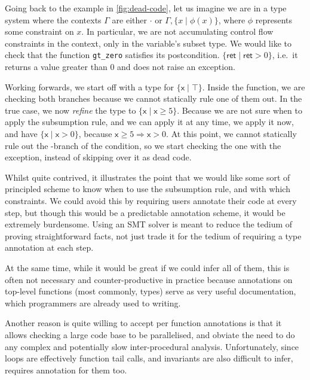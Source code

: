 
Going back to the example in \cref{fig:dead-code}, let us imagine we are in a
type system where the contexts $\Gamma$ are either $\cdot$ or $\Gamma, \{ x \mid
\phi(x) \}$, where $\phi$ represents some constraint on $x$. In particular, we
are not accumulating control flow constraints in the context, only
in the variable's subset type. We would like to check that the function
\texttt{gt_zero} satisfies its postcondition. $ \{ \mathsf{ret} \mid
\mathsf{ret} > 0 \} $, i.e.\ it returns a value greater than 0 and does not
raise an exception.

Working forwards, we start off with a type for $\{ \mathsf{x} \mid \top \}$.
Inside the function, we are checking both branches because we cannot statically
rule one of them out. In the true case, we now \emph{refine} the type to $\{
\mathsf{x} \mid \mathsf{x} \geq 5 \}$. Because we are not sure when to apply
the subsumption rule, and we can apply it at any time, we apply it now, and
have $\{ \mathsf{x} \mid \mathsf{x} > 0 \}$, because $\mathsf{x} \geq 5
\Rightarrow \mathsf{x} > 0$. At this point, we cannot statically rule out the
-branch of the condition, so we start checking the one with the
exception, instead of skipping over it as dead code.

Whilst quite contrived, it illustrates the point that we would like some sort
of principled scheme to know when to use the subsumption rule, and with which
constraints. We could avoid this by requiring users annotate their code at
every step, but though this would be a predictable annotation scheme, it would
be extremely burdensome. Using an SMT solver is meant to reduce the tedium of
proving straightforward facts, not just trade it for the tedium of requiring a
type annotation at each step.

At the same time, while it would be great if we could infer all of them, this
is often not necessary and counter-productive in practice because annotations
on top-level functions (most commonly, types) serve as very useful
documentation, which programmers are already used to writing.

Another reason  is quite willing to accept per function annotations is
that it allows checking a large code base to be parallelised, and obviate the
need to do any complex and potentially slow inter-procedural analysis.
Unfortunately, since loops are effectively function tail calls, and invariants
are also difficult to infer,  requires annotation for them too.

